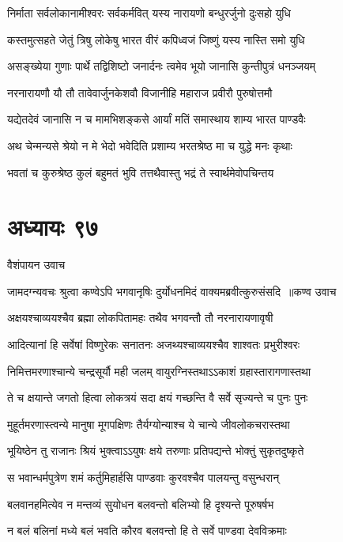\twolineshloka
{निर्माता सर्वलोकानामीश्वरः सर्वकर्मवित्}
{यस्य नारायणो बन्धुरर्जुनो दुःसहो युधि}


\twolineshloka
{कस्तमुत्सहते जेतुं त्रिषु लोकेषु भारत}
{वीरं कपिध्वजं जिष्णुं यस्य नास्ति समो युधि}


\twolineshloka
{असङ्ख्येया गुणाः पार्थे तद्विशिष्टो जनार्दनः}
{त्वमेव भूयो जानासि कुन्तीपुत्रं धनञ्जयम्}


\twolineshloka
{नरनारायणौ यौ तौ तावेवार्जुनकेशवौ}
{विजानीहि महाराज प्रवीरौ पुरुषोत्तमौ}


\twolineshloka
{यद्येतदेवं जानासि न च मामभिशङ्कसे}
{आर्यां मतिं समास्थाय शाम्य भारत पाण्डवैः}


\twolineshloka
{अथ चेन्मन्यसे श्रेयो न मे भेदो भवेदिति}
{प्रशाम्य भरतश्रेष्ठ मा च युद्धे मनः कृथाः}


\twolineshloka
{भवतां च कुरुश्रेष्ठ कुलं बहुमतं भुवि}
{तत्तथैवास्तु भद्रं ते स्वार्थमेवोपचिन्तय}


\chapter{अध्यायः ९७}
\twolineshloka
{वैशंपायन उवाच}
{}


\threelineshloka
{जामदग्न्यवचः श्रुत्वा कण्वेऽपि भगवानृषिः}
{दुर्योधनमिदं वाक्यमब्रवीत्कुरुसंसदि ॥कण्व उवाच}
{}


\twolineshloka
{अक्षयश्चाव्ययश्चैव ब्रह्मा लोकपितामहः}
{तथैव भगवन्तौ तौ नरनारायणावृषी}


\twolineshloka
{आदित्यानां हि सर्वेषां विष्णुरेकः सनातनः}
{अजथ्यश्चाव्ययश्चैव शाश्वतः प्रभुरीश्वरः}


\twolineshloka
{निमित्तमरणाश्चान्ये चन्द्रसूर्यौ मही जलम्}
{वायुरग्निस्तथाऽऽकाशं ग्रहास्तारागणास्तथा}


\twolineshloka
{ते च क्षयान्ते जगतो हित्वा लोकत्रयं सदा}
{क्षयं गच्छन्ति वै सर्वे सृज्यन्ते च पुनः पुनः}


\twolineshloka
{मुहूर्तमरणास्त्वन्ये मानुषा मूगपक्षिणः}
{तैर्यग्योन्याश्च ये चान्ये जीवलोकचरास्तथा}


\twolineshloka
{भूयिष्ठेन तु राजानः श्रियं भुक्त्वाऽऽयुषः क्षये}
{तरुणाः प्रतिपद्यन्ते भोक्तुं सुकृतदुष्कृते}


\twolineshloka
{स भवान्धर्मपुत्रेण शमं कर्तुमिहार्हसि}
{पाण्डवाः कुरवश्चैव पालयन्तु वसुन्धरान्}


\twolineshloka
{बलवानहमित्येव न मन्तव्यं सुयोधन}
{बलवन्तो बलिभ्यो हि दृश्यन्ते पूरुषर्षभ}


\threelineshloka
{न बलं बलिनां मध्ये बलं भवति कौरव}
{बलवन्तो हि ते सर्वे पाण्डवा देवविक्रमाः}
{}


